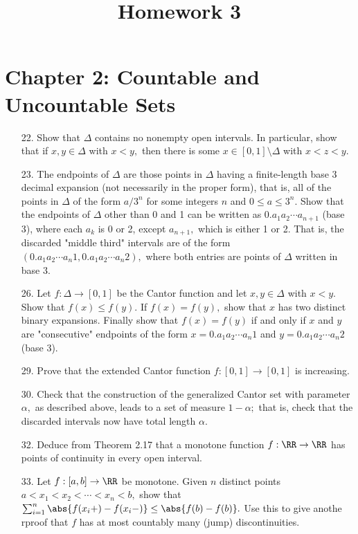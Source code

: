 \documentclass{article}
\begin{document}
\title{Homework 3}
\maketitle
\thispagestyle{fancy}

\section*{Chapter 2: Countable and Uncountable Sets}

\begin{itemize}
	\item[22.] Show that $\Delta$ contains no nonempty open intervals. In particular, show that if $x, y\in \Delta$ with $x<y,$ then there is some $x\in[0, 1]\setminus \Delta$ with $x<z<y.$

	\item[23.] The endpoints of $\Delta$ are those points in $\Delta$ having a finite-length base 3 decimal expansion (not necessarily in the proper form), that is, all of the points in $\Delta$ of the form $a/3^n$ for some integers $n$ and $0\le a\le 3^n.$ Show that the endpoints of $\Delta$ other than 0 and 1 can be written as $0.a_1a_2\cdots a_{n+1}$ (base 3), where each $a_k$ is 0 or 2, except $a_{n+1},$ which is either 1 or 2. That is, the discarded "middle third" intervals are of the form $(0.a_1a_2\cdots a_n1, 0.a_1a_2\cdots a_n2),$ where both entries are points of $\Delta$ written in base 3.

	\item[26.] Let $f:\Delta\to [0, 1]$ be the Cantor function and let $x, y\in \Delta$ with $x<y.$ Show that $f(x)\le f(y).$ If $f(x)=f(y),$ show that $x$ has two distinct binary expansions. Finally show that $f(x)=f(y)$ if and only if $x$ and $y$ are "consecutive" endpoints of the form $x=0.a_1a_2\cdots a_n1$ and $y=0.a_1a_2\cdots a_n2$ (base 3).

	\item[29.] Prove that the extended Cantor function $f:[0, 1]\to [0, 1]$ is increasing.

	\item[30.] Check that the construction of the generalized Cantor set with parameter $\alpha,$ as described above, leads to a set of measure $1-\alpha;$ that is, check that the discarded intervals now have total length $\alpha.$

	\item[32.] Deduce from Theorem 2.17 that a monotone function $f:\RR\to\RR$ has points of continuity in every open interval.

	\item[33.] Let $f:[a, b]\to \RR$ be monotone. Given $n$ distinct points $a<x_1<x_2<\cdots<x_n<b,$ show that $\sum_{i=1}^{n} \abs{f(x_i+)-f(x_i-)}\le \abs{f(b)-f(b)}.$ Use this to give anothe rproof that $f$ has at most countably many (jump) discontinuities. 
		
\end{itemize}
\end{document}
